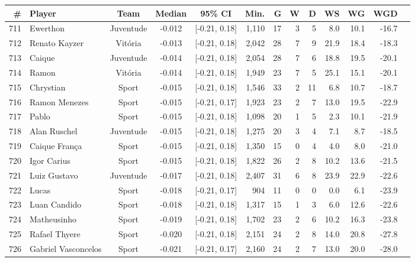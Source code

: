 \begin{table}[htbp]
    \centering
    \tiny
    \begin{tabular}{rlcccrrrrrrrr}
        \toprule
        \# & Player & Team & Median & 95\% CI & Min. & G & W & D & WS & WG & WGD \\
        \midrule
        711 & Ewerthon & Juventude & -0.012 & [-0.21, 0.18] & 1,110 & 17 & 3 & 5 & 8.0 & 10.1 & -16.7 \\
        712 & Renato Kayzer & Vitória & -0.013 & [-0.21, 0.18] & 2,042 & 28 & 7 & 9 & 21.9 & 18.4 & -18.3 \\
        713 & Caique & Juventude & -0.014 & [-0.21, 0.18] & 2,054 & 28 & 7 & 6 & 18.8 & 19.5 & -20.1 \\
        714 & Ramon & Vitória & -0.014 & [-0.21, 0.18] & 1,949 & 23 & 7 & 5 & 25.1 & 15.1 & -20.1 \\
        715 & Chrystian & Sport & -0.015 & [-0.21, 0.18] & 1,546 & 33 & 2 & 11 & 6.8 & 10.7 & -18.7 \\
        716 & Ramon Menezes & Sport & -0.015 & [-0.21, 0.17] & 1,923 & 23 & 2 & 7 & 13.0 & 19.5 & -22.9 \\
        717 & Pablo & Sport & -0.015 & [-0.21, 0.18] & 1,098 & 20 & 1 & 5 & 2.3 & 10.1 & -21.9 \\
        718 & Alan Ruschel & Juventude & -0.015 & [-0.21, 0.18] & 1,275 & 20 & 3 & 4 & 7.1 & 8.7 & -18.5 \\
        719 & Caique França & Sport & -0.015 & [-0.21, 0.18] & 1,350 & 15 & 0 & 4 & 4.0 & 8.0 & -21.0 \\
        720 & Igor Carius & Sport & -0.015 & [-0.21, 0.18] & 1,822 & 26 & 2 & 8 & 10.2 & 13.6 & -21.5 \\
        721 & Luiz Gustavo & Juventude & -0.017 & [-0.21, 0.18] & 2,407 & 31 & 6 & 8 & 23.9 & 22.9 & -22.6 \\
        722 & Lucas & Sport & -0.018 & [-0.21, 0.17] & 904 & 11 & 0 & 0 & 0.0 & 6.1 & -23.9 \\
        723 & Luan Candido & Sport & -0.018 & [-0.21, 0.18] & 1,317 & 15 & 1 & 3 & 6.0 & 12.6 & -22.6 \\
        724 & Matheusinho & Sport & -0.019 & [-0.21, 0.18] & 1,702 & 23 & 2 & 6 & 10.2 & 16.3 & -23.8 \\
        725 & Rafael Thyere & Sport & -0.020 & [-0.21, 0.18] & 2,151 & 24 & 2 & 8 & 14.0 & 20.8 & -27.8 \\
        726 & Gabriel Vasconcelos & Sport & -0.021 & [-0.21, 0.17] & 2,160 & 24 & 2 & 7 & 13.0 & 20.0 & -28.0 \\

\end{tabular}
\end{table}

